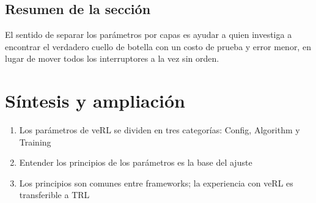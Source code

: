 \documentclass[a4paper]{article}
\begin{document}
\subsection{Resumen de la sección}
El sentido de separar los parámetros por capas es ayudar a quien investiga a encontrar el verdadero cuello de botella con un costo de prueba y error menor, en lugar de mover todos los interruptores a la vez sin orden.

\newpage
\section{Síntesis y ampliación}
\begin{enumerate}
  \item Los parámetros de veRL se dividen en tres categorías: Config, Algorithm y Training
  \item Entender los principios de los parámetros es la base del ajuste
  \item Los principios son comunes entre frameworks; la experiencia con veRL es transferible a TRL
\end{enumerate}
\end{document}
